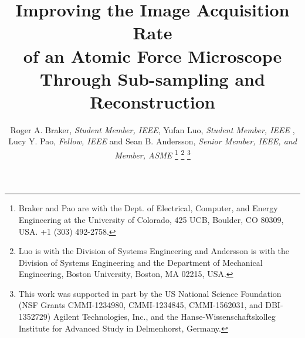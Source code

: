 \documentclass[journal]{IEEEtran}
\begin{document}
\title{Improving the Image Acquisition Rate \\ of an Atomic Force Microscope \\
Through Sub-sampling and Reconstruction}

\author{Roger A. Braker, \textit{Student Member, IEEE}, Yufan Luo, \textit{Student Member, IEEE} , Lucy Y. Pao, \textit{Fellow, IEEE} and Sean B. Andersson, \textit{Senior Member, IEEE, and Member, ASME}
  \thanks{Braker and Pao are with the Dept. of Electrical, Computer, and
    Energy Engineering at the University of Colorado, 425 UCB,
    Boulder, CO 80309, USA. %
    +1 (303) 492-2758.}%
    \thanks{Luo is with the Division of Systems Engineering and Andersson is with the Division of Systems Engineering and the Department of Mechanical Engineering, Boston University, Boston, MA 02215, USA.}
  \thanks{This work was supported in part by the US National Science
    Foundation (NSF Grants CMMI-1234980, CMMI-1234845, CMMI-1562031, and DBI-1352729)  Agilent Technologies,
    Inc., and the Hanse-Wissenschaftskolleg Institute for Advanced Study in Delmenhorst, Germany.} }
\end{document}
